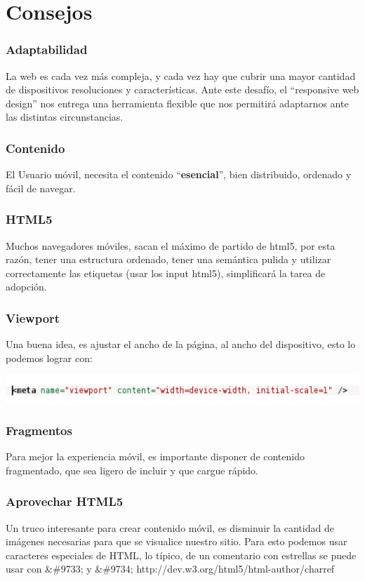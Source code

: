 \documentclass[12pt]{beamer}
\begin{document}
\section{Consejos}

\begin{frame}
 \frametitle{Adaptabilidad}
 La web es cada vez más compleja, y cada vez hay que cubrir una mayor cantidad de dispositivos resoluciones y características. 
 \newline
 Ante este desafío, el ``responsive web design'' nos entrega una herramienta flexible que nos permitirá adaptarnos ante las distintas circunstancias.
\end{frame}


\begin{frame}
 \frametitle{Contenido}
 El Usuario móvil, necesita el contenido ``{\bf esencial}'', bien distribuido, ordenado y fácil de navegar.
\end{frame}

\begin{frame}
 \frametitle{HTML5}
 Muchos navegadores móviles, sacan el máximo de partido de html5, por esta razón, tener una estructura ordenado, tener una semántica pulida y utilizar correctamente las etiquetas (usar los input html5), simplificará la tarea de adopción.
\end{frame}

\begin{frame}
 \frametitle{Viewport}
 Una buena idea, es ajustar el ancho de la página, al ancho del dispositivo, esto lo podemos lograr con:
 \begin{center}
    \includegraphics[scale=0.75]{img/viewport.png}
 \end{center}
\end{frame}


\begin{frame}
 \frametitle{Fragmentos}
 Para mejor la experiencia móvil, es importante disponer de contenido fragmentado, que sea ligero de incluir y que cargue rápido.
\end{frame}


\begin{frame}
 \frametitle{Aprovechar HTML5}
 Un truco interesante para crear contenido móvil, es disminuir la cantidad de imágenes necesarias para que se visualice nuestro sitio. Para esto podemos usar caracteres especiales de HTML, lo típico, de un comentario con estrellas se puede usar con \&\#9733; y \&\#9734;
 \newline
 http://dev.w3.org/html5/html-author/charref
\end{frame}
\end{document}
